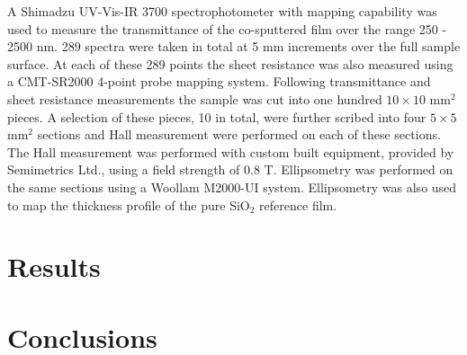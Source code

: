 \documentclass[aps,prl,5p,showpacs,showkeys,linenumbers, twocolumn]{revtex4-1}
\begin{document}
A Shimadzu UV-Vis-IR 3700 spectrophotometer with mapping capability was used to measure the transmittance of the co-sputtered film over the range 250 - 2500 nm. 289 spectra were taken in total at 5 mm increments over the full sample surface. At each of these 289 points the sheet resistance was also measured using a CMT-SR2000 4-point probe mapping system. Following transmittance and sheet resistance measurements the sample was cut into one hundred $10\times10$ mm$^2$ pieces. A selection of these pieces, 10 in total, were further scribed into four $5\times5$ mm$^2$ sections and Hall measurement were performed on each of these sections. The Hall measurement was performed with custom built equipment, provided by Semimetrics Ltd., using a field strength of 0.8 T.  Ellipsometry was performed on the same sections using a Woollam M2000-UI system. Ellipsometry was also used to map the thickness profile of the pure SiO$_{2}$ reference film.

\section{Results}

\section{Conclusions}
\end{document}
